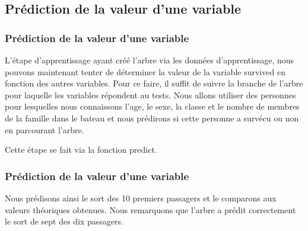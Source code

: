 \documentclass[compress]{beamer}
\begin{document}
\subsection{Prédiction de la valeur d'une variable}
\begin{frame}
\frametitle{Prédiction de la valeur d'une variable}
L'étape d'apprentissage ayant créé l'arbre via les données d'apprentissage, nous pouvons maintenant tenter de déterminer la valeur de la variable \textrm{survived}
en fonction des autres variables. Pour ce faire, il suffit de suivre la branche de l'arbre pour laquelle les variables répondent au tests.\newline
 Nous allons utiliser des personnes pour lesquelles nous connaissons l'age, le sexe, la classe et le nombre de membres de la famille dans le bateau et nous prédirons
 si cette personne a survécu ou non en parcourant l'arbre.\newline

Cette étape se fait via la fonction \textrm{predict}. \newline
 
\end{frame}
\begin{frame}
\frametitle{Prédiction de la valeur d'une variable}
 

Nous prédisons ainsi le sort des 10 premiers passagers et le comparons aux valeurs théoriques obtenues. Nous remarquons que l'arbre a prédit correctement le sort
de sept des dix passagers.
\end{frame}
\end{document}
